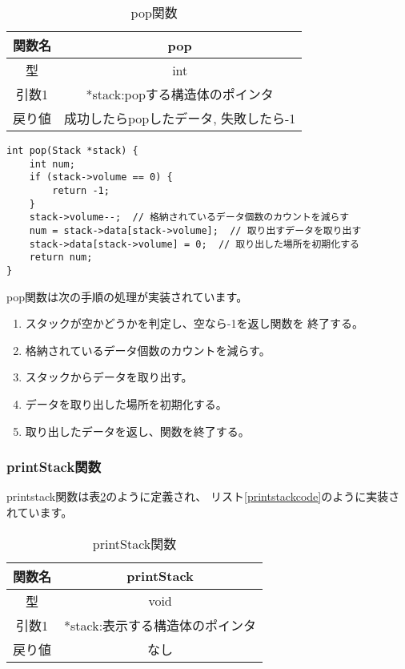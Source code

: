 \documentclass[a4j]{jarticle}
\begin{document}
\begin{table}[h]
  \centering
  \caption{pop関数}
  \label{tb:pop}
  \begin{tabular}{|c|c|}
    \hline
    関数名 & pop                    \\
    \hline
    型   & int                    \\
    \hline
    引数1 & *stack:popする構造体のポインタ   \\
    \hline
    戻り値 & 成功したらpopしたデータ, 失敗したら-1 \\
    \hline
  \end{tabular}
\end{table}

\begin{lstlisting}[caption=pop関数,label=popcode]
  int pop(Stack *stack) {
    int num;
    if (stack->volume == 0) {
        return -1;
    }
    stack->volume--;  // 格納されているデータ個数のカウントを減らす
    num = stack->data[stack->volume];  // 取り出すデータを取り出す
    stack->data[stack->volume] = 0;  // 取り出した場所を初期化する
    return num;
}
  \end{lstlisting}

pop関数は次の手順の処理が実装されています。
\begin{enumerate}
  \item スタックが空かどうかを判定し、空なら-1を返し関数を
        終了する。
  \item 格納されているデータ個数のカウントを減らす。
  \item スタックからデータを取り出す。
  \item データを取り出した場所を初期化する。
  \item 取り出したデータを返し、関数を終了する。
\end{enumerate}

\subsubsection{printStack関数}
printstack関数は表\ref{tb:printstack}のように定義され、
リスト\ref{printstackcode}のように実装されています。

\begin{table}[h]
  \centering
  \caption{printStack関数}
  \label{tb:printstack}
  \begin{tabular}{|c|c|}
    \hline
    関数名 & printStack          \\
    \hline
    型   & void                \\
    \hline
    引数1 & *stack:表示する構造体のポインタ \\
    \hline
    戻り値 & なし                  \\
    \hline
  \end{tabular}
\end{table}
\end{document}
